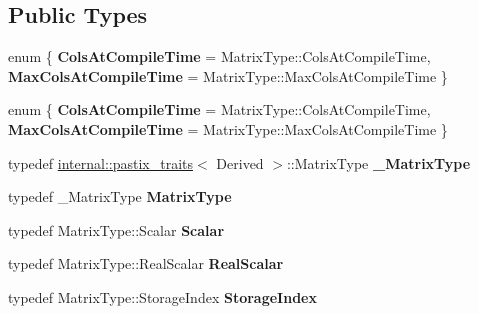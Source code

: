 \subsection*{Public Types}
\begin{DoxyCompactItemize}
\item 
\mbox{\label{class_eigen_1_1_pastix_base_a003e696992a677e388605f77ff604979}} 
enum \{ {\bfseries Cols\+At\+Compile\+Time} = Matrix\+Type\+:\+:Cols\+At\+Compile\+Time, 
{\bfseries Max\+Cols\+At\+Compile\+Time} = Matrix\+Type\+:\+:Max\+Cols\+At\+Compile\+Time
 \}
\item 
\mbox{\label{class_eigen_1_1_pastix_base_af6e11bf52e7001aea21b903511b44a87}} 
enum \{ {\bfseries Cols\+At\+Compile\+Time} = Matrix\+Type\+:\+:Cols\+At\+Compile\+Time, 
{\bfseries Max\+Cols\+At\+Compile\+Time} = Matrix\+Type\+:\+:Max\+Cols\+At\+Compile\+Time
 \}
\item 
\mbox{\label{class_eigen_1_1_pastix_base_a3590da53cc9d964ebc0e7c1ef62860d5}} 
typedef \hyperlink{struct_eigen_1_1internal_1_1pastix__traits}{internal\+::pastix\+\_\+traits}$<$ Derived $>$\+::Matrix\+Type {\bfseries \+\_\+\+Matrix\+Type}
\item 
\mbox{\label{class_eigen_1_1_pastix_base_a6cd35cdf1999768f6d99465b466f6afd}} 
typedef \+\_\+\+Matrix\+Type {\bfseries Matrix\+Type}
\item 
\mbox{\label{class_eigen_1_1_pastix_base_a9f25544947ef1a53a24b60103e3971e0}} 
typedef Matrix\+Type\+::\+Scalar {\bfseries Scalar}
\item 
\mbox{\label{class_eigen_1_1_pastix_base_a3a5f114fdba041a4c588e0034eb989a5}} 
typedef Matrix\+Type\+::\+Real\+Scalar {\bfseries Real\+Scalar}
\item 
\mbox{\label{class_eigen_1_1_pastix_base_a2e10075626ec849c47c2360653e1a89d}} 
typedef Matrix\+Type\+::\+Storage\+Index {\bfseries Storage\+Index}
\item 
\mbox{\label{class_eigen_1_1_pastix_base_aabb830048edd554f4fbcadd85408d9ab}} 

\end{DoxyCompactItemize}
